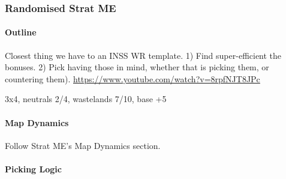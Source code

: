 \subsubsection{Randomised Strat ME}

\paragraph{Outline}
Closest thing we have to an INSS WR template. 1) Find super-efficient the bonuses. 2) Pick having those in mind, whether that is picking them, or countering them).
\url{https://www.youtube.com/watch?v=8rpfNJT8JPc}

3x4, neutrals 2/4, wastelands 7/10, base +5

\paragraph{Map Dynamics}

Follow Strat ME's Map Dynamics section.

\paragraph{Picking Logic}


